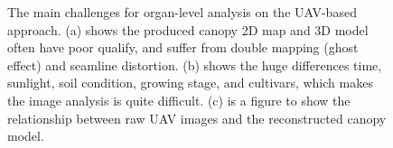 \begin{figure}[htb]
  \begin{center}
  \end{center}
  \caption[Organ-level analysis challenges of UAV-based approach]{
    The main challenges for organ-level analysis on the UAV-based approach. (a) shows the produced canopy 2D map and 3D model often have poor qualify, and suffer from double mapping (ghost effect) and seamline distortion. (b) shows the huge differences time, sunlight, soil condition, growing stage, and cultivars, which makes the image analysis is quite difficult. (c) is a figure to show the relationship between raw UAV images and the reconstructed canopy model.
  }
  \label{fig:idp1}
\end{figure}